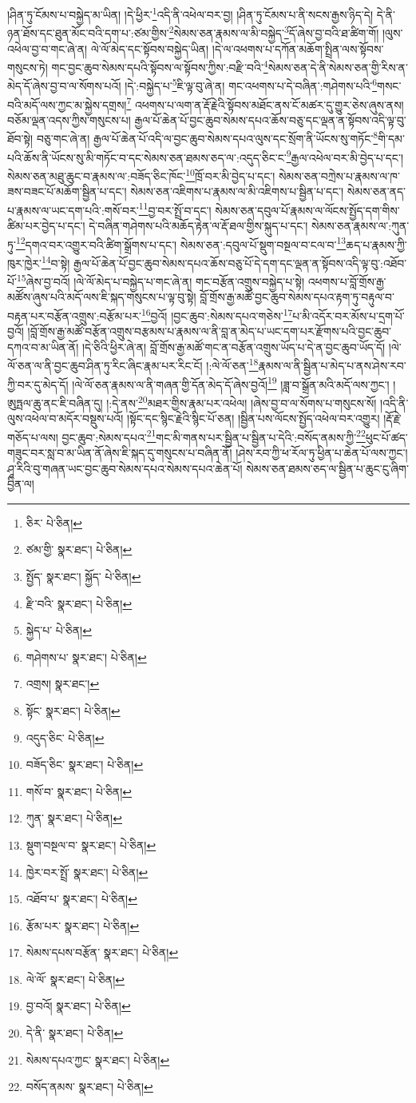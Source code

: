 །ཤིན་ཏུ་ངོམས་པ་བསྐྱེད་མ་ཡིན། །དེ་ཕྱིར་\footnote{ཅིར་  པེ་ཅིན། }འདི་ནི་འཕེལ་བར་བྱ། །ཤིན་ཏུ་ངོམས་པ་ནི་སངས་རྒྱས་ཉིད་དེ། དེ་ནི་ཉན་ཐོས་དང་ཐུན་མོང་བའི་དག་པ་:ཙམ་གྱིས་\footnote{ཙམ་གྱི་  སྣར་ཐང་།  པེ་ཅིན། }སེམས་ཅན་རྣམས་ལ་མི་བསྐྱེད་\footnote{སྤྱོད་  སྣར་ཐང་། སྐྱོད་  པེ་ཅིན། }དོ་ཞེས་བྱ་བའི་ཐ་ཚིག་གོ། །ལུས་འཕེལ་བྱ་བ་གང་ཞེ་ན། ལེ་ལོ་མེད་དང་སྟོབས་བསྐྱེད་ཡིན། །དེ་ལ་འཕགས་པ་དཀོན་མཆོག་སྤྲིན་ལས་སྟོབས་གསུངས་ཏེ། གང་བྱང་ཆུབ་སེམས་དཔའི་སྟོབས་ལ་སྟོབས་ཀྱིས་:བརྫི་བའི་\footnote{རྫི་བའི་  སྣར་ཐང་།  པེ་ཅིན། }སེམས་ཅན་དེ་ནི་སེམས་ཅན་གྱི་རིས་ན་མེད་དོ་ཞེས་བྱ་བ་ལ་སོགས་པའོ། །དེ་:བསྐྱེད་པ་\footnote{སྐྱེད་པ་  པེ་ཅིན། }ཇི་ལྟ་བུ་ཞེ་ན། གང་འཕགས་པ་དེ་བཞིན་:གཤེགས་པའི་\footnote{གཤེགས་པ་  སྣར་ཐང་།  པེ་ཅིན། }གསང་བའི་མདོ་ལས་ཀྱང་མ་སྐྱེས་དགྲས།\footnote{འགྲས།  སྣར་ཐང་། } འཕགས་པ་ལག་ན་རྡོ་རྗེའི་སྟོབས་མཐོང་ནས་ངོ་མཚར་དུ་གྱུར་ཅེས་ཞུས་ནས། བཅོམ་ལྡན་འདས་ཀྱིས་གསུངས་པ། རྒྱལ་པོ་ཆེན་པོ་བྱང་ཆུབ་སེམས་དཔའ་ཆོས་བཅུ་དང་ལྡན་ན་སྟོབས་འདི་ལྟ་བུ་ཐོབ་སྟེ། བཅུ་གང་ཞེ་ན། རྒྱལ་པོ་ཆེན་པོ་འདི་ལ་བྱང་ཆུབ་སེམས་དཔའ་ལུས་དང་སྲོག་ནི་ཡོངས་སུ་གཏོང་\footnote{སྟོང་  སྣར་ཐང་།  པེ་ཅིན། }གི་དམ་པའི་ཆོས་ནི་ཡོངས་སུ་མི་གཏོང་བ་དང་སེམས་ཅན་ཐམས་ཅད་ལ་:འདུད་ཅིང་ང་\footnote{འདུད་ཅིང་  པེ་ཅིན། }རྒྱལ་འཕེལ་བར་མི་བྱེད་པ་དང་། སེམས་ཅན་མཐུ་ཆུང་བ་རྣམས་ལ་:བཟོད་ཅིང་ཁོང་\footnote{བཟོད་ཅིང་  སྣར་ཐང་།  པེ་ཅིན། }ཁྲོ་བར་མི་བྱེད་པ་དང་། སེམས་ཅན་བཀྲེས་པ་རྣམས་ལ་ཁ་ཟས་བཟང་པོ་མཆོག་སྦྱིན་པ་དང་། སེམས་ཅན་འཇིགས་པ་རྣམས་ལ་མི་འཇིགས་པ་སྦྱིན་པ་དང་། སེམས་ཅན་ནད་པ་རྣམས་ལ་ཡང་དག་པའི་:གསོ་བར་\footnote{གསོ་བ་  སྣར་ཐང་།  པེ་ཅིན། }བྱ་བར་སྤྲོ་བ་དང་། སེམས་ཅན་དབུལ་པོ་རྣམས་ལ་ལོངས་སྤྱོད་དག་གིས་ཚིམ་པར་བྱེད་པ་དང་། དེ་བཞིན་གཤེགས་པའི་མཆོད་རྟེན་ལ་རྡོ་ཐལ་གྱིས་སྐུད་པ་དང་། སེམས་ཅན་རྣམས་ལ་:ཀུན་ཏུ་\footnote{ཀུན་  སྣར་ཐང་།  པེ་ཅིན། }དགའ་བར་འགྱུར་བའི་ཚིག་སྒྲོགས་པ་དང་། སེམས་ཅན་:དབུལ་པོ་སྡུག་བསྔལ་བ་ངལ་བ་\footnote{སྡུག་བསྔལ་བ་  སྣར་ཐང་།  པེ་ཅིན། }ཆད་པ་རྣམས་ཀྱི་ཁུར་ཁྱེར་\footnote{ཁྱེར་བར་སྤྲོ་  སྣར་ཐང་།  པེ་ཅིན། }བ་སྟེ། རྒྱལ་པོ་ཆེན་པོ་བྱང་ཆུབ་སེམས་དཔའ་ཆོས་བཅུ་པོ་དེ་དག་དང་ལྡན་ན་སྟོབས་འདི་ལྟ་བུ་:འཐོབ་པོ་\footnote{འཐོབ་པ་  སྣར་ཐང་།  པེ་ཅིན། }ཞེས་བྱ་བའོ། །ལེ་ལོ་མེད་པ་བསྐྱེད་པ་གང་ཞེ་ན། གང་བརྩོན་འགྲུས་བསྐྱེད་པ་སྟེ། འཕགས་པ་བློ་གྲོས་རྒྱ་མཚོས་ཞུས་པའི་མདོ་ལས་ཇི་སྐད་གསུངས་པ་ལྟ་བུ་སྟེ། བློ་གྲོས་རྒྱ་མཚོ་བྱང་ཆུབ་སེམས་དཔའ་རྟག་ཏུ་བརྟུལ་བ་བརྟན་པར་བརྩོན་འགྲུས་:བརྩོམ་པར་\footnote{རྩོམ་པར་  སྣར་ཐང་།  པེ་ཅིན། }བྱའོ། །བྱང་ཆུབ་:སེམས་དཔའ་གཅེས་\footnote{སེམས་དཔས་བརྩོན་  སྣར་ཐང་།  པེ་ཅིན། }པ་མི་འདོར་བར་མོས་པ་དྲག་པོ་བྱའོ། །བློ་གྲོས་རྒྱ་མཚོ་བརྩོན་འགྲུས་བརྩམས་པ་རྣམས་ལ་ནི་བླ་ན་མེད་པ་ཡང་དག་པར་རྫོགས་པའི་བྱང་ཆུབ་དཀའ་བ་མ་ཡིན་ནོ། །དེ་ཅིའི་ཕྱིར་ཞེ་ན། བློ་གྲོས་རྒྱ་མཚོ་གང་ན་བརྩོན་འགྲུས་ཡོད་པ་དེ་ན་བྱང་ཆུབ་ཡོད་དོ། །ལེ་ལོ་ཅན་ལ་ནི་བྱང་ཆུབ་ཤིན་ཏུ་རིང་ཞིང་རྣམ་པར་རིང་ངོ། །:ལེ་ལོ་ཅན་\footnote{ལེ་ལོ་  སྣར་ཐང་།  པེ་ཅིན། }རྣམས་ལ་ནི་སྦྱིན་པ་མེད་པ་ནས་ཤེས་རབ་ཀྱི་བར་དུ་མེད་དོ། །ལེ་ལོ་ཅན་རྣམས་ལ་ནི་གཞན་གྱི་དོན་མེད་དོ་ཞེས་བྱའོ།\footnote{བྱ་བའོ།  སྣར་ཐང་།  པེ་ཅིན། } །ཟླ་བ་སྒྲོན་མའི་མདོ་ལས་ཀྱང་། །ཨུཏྤལ་ཆུ་ནང་ཇི་བཞིན་དུ། །:དེ་ནས་\footnote{དེ་ནི་  སྣར་ཐང་།  པེ་ཅིན། }མཐར་གྱིས་རྣམ་པར་འཕེལ། །ཞེས་བྱ་བ་ལ་སོགས་པ་གསུངས་སོ། །འདི་ནི་ལུས་འཕེལ་བ་མདོར་བསྡུས་པའོ། །སྟོང་དང་སྙིང་རྗེའི་སྙིང་པོ་ཅན། །སྦྱིན་པས་ལོངས་སྤྱོད་འཕེལ་བར་འགྱུར། །རྡོ་རྗེ་གཅོད་པ་ལས། བྱང་ཆུབ་:སེམས་དཔའ་\footnote{སེམས་དཔའ་ཀྱང་  སྣར་ཐང་།  པེ་ཅིན། }གང་མི་གནས་པར་སྦྱིན་པ་སྦྱིན་པ་དེའི་:བསོད་ནམས་ཀྱི་\footnote{བསོད་ནམས་  སྣར་ཐང་།  པེ་ཅིན། }ཕུང་པོ་ཚད་གཟུང་བར་སླ་བ་མ་ཡིན་ནོ་ཞེས་ཇི་སྐད་དུ་གསུངས་པ་བཞིན་ནོ། །ཤེས་རབ་ཀྱི་ཕ་རོལ་ཏུ་ཕྱིན་པ་ཆེན་པོ་ལས་ཀྱང་། ཤཱ་རིའི་བུ་གཞན་ཡང་བྱང་ཆུབ་སེམས་དཔའ་སེམས་དཔའ་ཆེན་པོ། སེམས་ཅན་ཐམས་ཅད་ལ་སྦྱིན་པ་ཆུང་ངུ་ཞིག་བྱིན་ལ། 